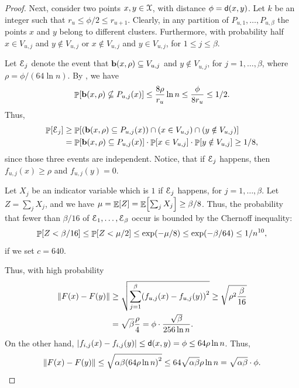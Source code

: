 \begin{proof}
    
    Next, consider two points $x,y \in \FMS$, with distance $\phi=
    \mathsf{d}(x,y)$. Let $k$ be an integer such that $r_u \leq \phi/2 \leq
    r_{u+1}$. Clearly, in any partition of $P_{u,1}, \ldots,
    P_{u,\beta}$ the points $x$ and $y$ belong to different clusters.
    Furthermore, with probability half $x \in V_{u,j}$ and $y \notin
    V_{u,j}$ or $x \notin V_{u,j}$ and $y \in
    V_{u,j}$, for $1 \leq j \leq \beta$.
    
    Let $\EuScript{E}_j$ denote the event that $\mathbf{b}(x,\rho) \subseteq
    V_{u,j}$ and $y \notin V_{u,j}$, for $j=1,\ldots, \beta$, where
    $\rho=\phi /(64 \ln n)$. By , we have
    \begin{equation*}
    \Prob{\Ball(x,\rho) \nsubseteq P_{u,j}(x) } \leq \frac{8\rho}{r_u}
    \ln n \leq \frac{\phi}{8r_u}
    \leq 1/2.
    \end{equation*}
    Thus, 
    \begin{align*}
      \Prob{\Event_j}%
      &\geq%
        \Prob{\pth{\Ball(x,\rho) \subseteq
        P_{u,j}(x) \MakeBig }
        \cap \pth{x \in V_{u,j}} \cap \pth{ y \notin V_{u,j}} }%
      \\&%
      =%
      \Prob{\Ball(x,\rho) \subseteq P_{u,j}(x) } \cdot 
      \Prob{ x \in V_{u,j}} \cdot
      \Prob{ y \notin V_{u,j} } \geq 1/8,
    \end{align*}
    since those three events are independent.  Notice, that if
    $\EuScript{E}_j$ happens, then $f_{u,j}(x) \geq \rho$ and
    $f_{u,j}(y)=0$.
    
    Let $X_j$ be an indicator variable which is $1$ if $\EuScript{E}_j$
    happens, for $j=1,\ldots,\beta$. Let $Z = \sum_j X_j$, and we have
    $\mu = \mathop{\mathbb{E}}\!\left[ {Z } \right] = \mathop{\mathbb{E}}\!\left[ { \sum_j X_j} \right] \geq \beta/8$. Thus, the
    probability that fewer than $\beta/16$ of
    $\EuScript{E}_1,\ldots,\EuScript{E}_\beta$ occur is bounded by the Chernoff inequality:
    \[
    \Prob{Z<\beta/16}\leq\Prob{Z<\mu/2}
    \leq \exp(-\mu/8)\leq\exp(-\beta/64)\leq 1/n^{10},
    \]
    if we set $c=640$.
    
    Thus, with high probability
    \begin{align*}
    \dist{F(x) - F(y)} &\geq \sqrt{\sum_{j=1}^{\beta} \pth{f_{u,j}(x) -
          f_{u,j}(y)}^2 }\geq \sqrt{ \rho^2 \frac{\beta}{16}}
    \\&= 
    \sqrt{\beta} \frac{\rho}{4} = \phi \cdot \frac{\sqrt{\beta}}{256
          \ln n}.
    \end{align*}    
    On the other hand, $\left| {f_{i,j}(x) - f_{i,j}(y)} \right| \leq
    \mathsf{d}(x,y) = \phi \leq 64 \rho \ln n$. Thus,
    \begin{equation*}
    \dist{F(x) - F(y)} \leq \sqrt{\alpha \beta \pth{64 \rho \ln n}^2 } 
    \leq 64 \sqrt{\alpha \beta} \rho \ln n = \sqrt{\alpha \beta} \cdot
    \phi.
    \end{equation*}
    

\end{proof}
